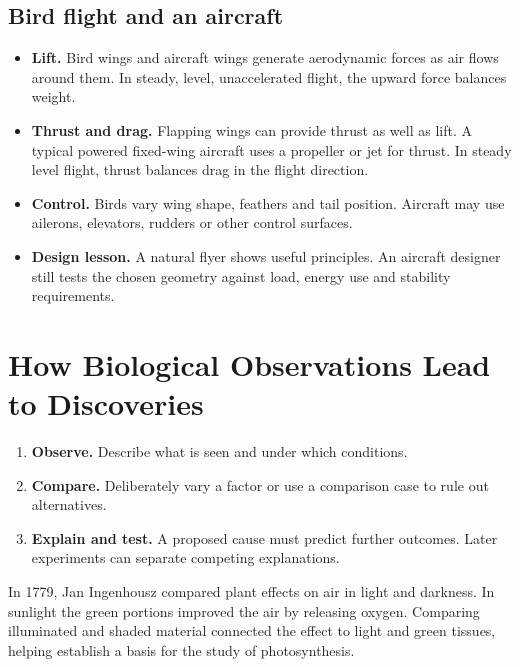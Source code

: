 \documentclass[12pt,a4paper]{article}
\begin{document}
\subsection{Bird flight and an aircraft}
\begin{itemize}[leftmargin=*, itemsep=3pt, topsep=4pt]
  \item \textbf{Lift.} Bird wings and aircraft wings generate aerodynamic forces as air flows around them. In steady, level, unaccelerated flight, the upward force balances weight.
  \item \textbf{Thrust and drag.} Flapping wings can provide thrust as well as lift. A typical powered fixed-wing aircraft uses a propeller or jet for thrust. In steady level flight, thrust balances drag in the flight direction.
  \item \textbf{Control.} Birds vary wing shape, feathers and tail position. Aircraft may use ailerons, elevators, rudders or other control surfaces.
  \item \textbf{Design lesson.} A natural flyer shows useful principles. An aircraft designer still tests the chosen geometry against load, energy use and stability requirements.
\end{itemize}
\section{How Biological Observations Lead to Discoveries}
\begin{enumerate}[leftmargin=*, itemsep=3pt, topsep=4pt]
  \item \textbf{Observe.} Describe what is seen and under which conditions.
  \item \textbf{Compare.} Deliberately vary a factor or use a comparison case to rule out alternatives.
  \item \textbf{Explain and test.} A proposed cause must predict further outcomes. Later experiments can separate competing explanations.
\end{enumerate}
\begin{tcolorbox}[examplebox, title={An eighteenth-century example: Ingenhousz}]
In 1779, Jan Ingenhousz compared plant effects on air in light and darkness. In sunlight the green portions improved the air by releasing oxygen. Comparing illuminated and shaded material connected the effect to light and green tissues, helping establish a basis for the study of photosynthesis.
\end{tcolorbox}
\end{document}
